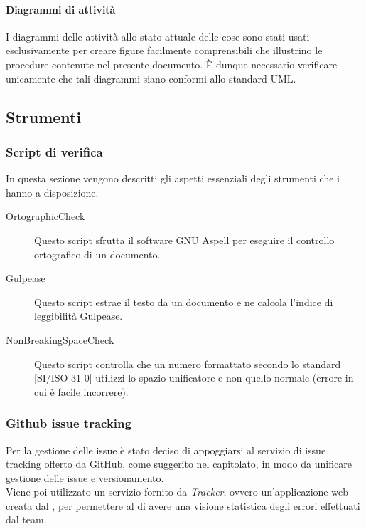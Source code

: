			\paragraph{Diagrammi di attività}
				I diagrammi delle attività allo stato attuale delle cose sono stati usati esclusivamente per creare figure facilmente comprensibili che illustrino le procedure contenute nel presente documento. È dunque necessario verificare unicamente che tali diagrammi siano conformi allo standard UML.

	\subsection{Strumenti}

		\subsubsection{Script di verifica}
			In questa sezione vengono descritti gli aspetti essenziali degli strumenti che i  hanno a disposizione.
			\begin{description}
				\item[OrtographicCheck] Questo script sfrutta il software GNU Aspell per eseguire il controllo ortografico di un documento.
				\item[Gulpease] Questo script estrae il testo da un documento e ne calcola l'indice di leggibilità Gulpease.
				\item[NonBreakingSpaceCheck] Questo script controlla che un numero formattato secondo lo standard [SI/ISO 31-0] utilizzi lo spazio unificatore e non quello normale (errore in cui è facile incorrere).
			\end{description}

		\subsubsection{Github issue tracking}
			Per la gestione delle issue è stato deciso di appoggiarsi al servizio di issue tracking offerto da GitHub, come suggerito nel capitolato, in modo da unificare gestione delle issue e versionamento. \\
			Viene poi utilizzato un servizio fornito da \textit{Tracker}, ovvero un'applicazione web creata dal \groupname, per permettere al  di avere una visione statistica degli errori effettuati dal team.

